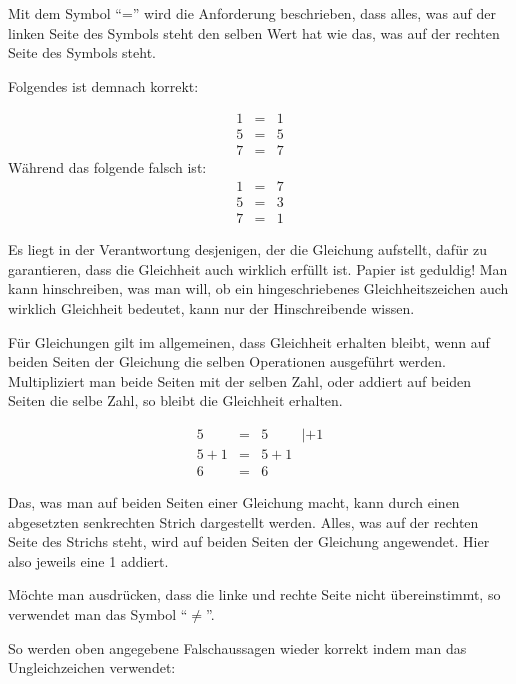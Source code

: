 \begin{definition}
Mit dem Symbol "`="' wird die Anforderung beschrieben, dass alles, was auf der linken Seite des Symbols steht den selben Wert hat wie das, was auf der rechten Seite des Symbols steht. 
\end{definition}
Folgendes ist demnach korrekt:

\begin{eqnarray*}
1 &=& 1 \\
5 &=& 5 \\
7 &=& 7
\end{eqnarray*}
Während das folgende falsch ist:
\begin{eqnarray*}
1 &=& 7 \\
5 &=& 3 \\
7 &=& 1
\end{eqnarray*}

Es liegt in der Verantwortung desjenigen, der die Gleichung aufstellt, dafür zu garantieren, dass die Gleichheit auch wirklich erfüllt ist. Papier ist geduldig! Man kann hinschreiben, was man will, ob ein hingeschriebenes Gleichheitszeichen auch wirklich Gleichheit bedeutet, kann nur der Hinschreibende wissen.

Für Gleichungen gilt im allgemeinen, dass Gleichheit erhalten bleibt, wenn auf beiden Seiten der Gleichung die selben Operationen ausgeführt werden. Multipliziert man beide Seiten mit der selben Zahl, oder addiert auf beiden Seiten die selbe Zahl, so bleibt die Gleichheit erhalten.

\begin{eqnarray*}
5 &=& 5  \hspace{1cm}| +1\\
5+1 &=& 5+1 \\
6 &=& 6
\end{eqnarray*}

Das, was man auf beiden Seiten einer Gleichung macht, kann durch einen abgesetzten senkrechten Strich dargestellt werden. Alles, was auf der rechten Seite des Strichs steht, wird auf beiden Seiten der Gleichung angewendet. Hier also jeweils eine 1 addiert.

\begin{definition}
Möchte man ausdrücken, dass die linke und rechte Seite nicht übereinstimmt, so verwendet man das Symbol "`$\neq $"'. 
\end{definition}
So werden oben angegebene Falschaussagen wieder korrekt indem man das Ungleichzeichen verwendet: 

